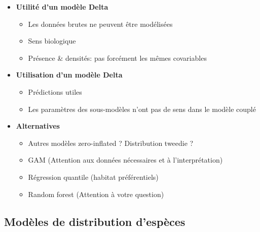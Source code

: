 \documentclass[french,a4paper]{article}
\providecommand{\tightlist}{%
  \setlength{\itemsep}{0pt}\setlength{\parskip}{0pt}}
\begin{document}
\begin{itemize}
\tightlist
\item
  \textbf{Utilité d'un modèle Delta}

  \begin{itemize}
  \tightlist
  \item
    Les données brutes ne peuvent être modélisées
  \item
    Sens biologique
  \item
    Présence \& densités: pas forcément les mêmes covariables
  \end{itemize}
\item
  \textbf{Utilisation d'un modèle Delta}

  \begin{itemize}
  \tightlist
  \item
    Prédictions utiles
  \item
    Les paramètres des sous-modèles n'ont pas de sens dans le modèle couplé
  \end{itemize}
\item
  \textbf{Alternatives}

  \begin{itemize}
  \tightlist
  \item
    Autres modèles zero-inflated ? Distribution tweedie ?
  \item
    GAM (Attention aux données nécessaires et à l'interprétation)
  \item
    Régression quantile (habitat préférentiels)
  \item
    Random forest (Attention à votre question)
  \end{itemize}
\end{itemize}

\hypertarget{modeles-de-distribution-despeces}{%
\subsection{Modèles de distribution d'espèces}\label{modeles-de-distribution-despeces}}
\end{document}
